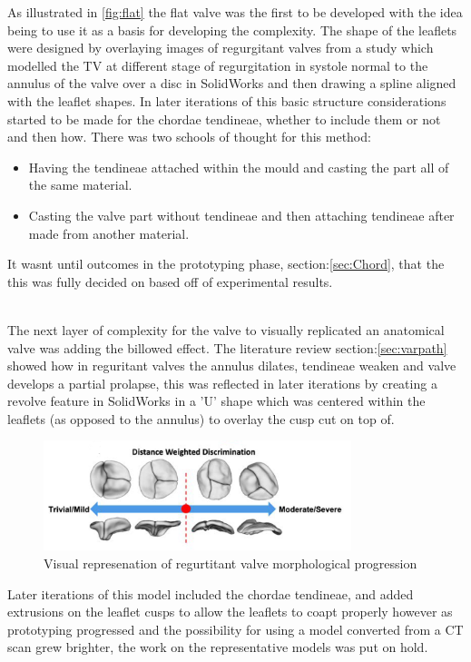 As illustrated in \cref{fig:flat} the flat valve was the first to be developed with the idea being to use it as a basis for developing the complexity. The shape of the leaflets were designed by overlaying images of regurgitant valves from a study which modelled the \gls{TV} at different stage of regurgitation  in systole normal to the annulus of the valve over a disc in SolidWorks and then drawing a spline aligned with the leaflet shapes.
In later iterations of this basic structure considerations started to be made for the chordae tendineae, whether to include them or not and then how. There was two schools of thought for this method:
\begin{itemize}
    \item Having the tendineae attached within the mould and casting the part all of the same material.
    \item Casting the valve part without tendineae and then attaching tendineae after made from another material.
\end{itemize}
It wasnt until outcomes in the prototyping phase, section:\cref{sec:Chord}, that the this was fully decided on based off of experimental results.

\\
The next layer of complexity for the valve to visually replicated an anatomical valve was adding the billowed effect.
The literature review section:\cref{sec:varpath} showed how in reguritant valves the annulus dilates, tendineae weaken and valve develops a partial prolapse, this was reflected in later iterations by creating a revolve feature in SolidWorks in a 'U' shape which was centered within the leaflets (as opposed to the annulus) to overlay the cusp cut on top of.
\begin{figure}
    \centering
    \includegraphics[width=0.8\textwidth]{figures/billow}
    \caption{Visual represenation of regurtitant valve morphological progression }
    \label{fig:bill}
\end{figure}
Later iterations of this model included the chordae tendineae, and added extrusions on the leaflet cusps to allow the leaflets to coapt properly however as prototyping progressed and the possibility for using a model converted from a \gls{CT} scan grew brighter, the work on the representative models was put on hold.


